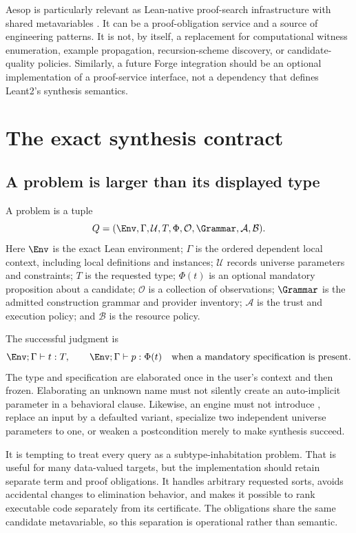 Aesop is particularly relevant as Lean-native proof-search infrastructure with shared metavariables \cite{aesop}. It can be a proof-obligation service and a source of engineering patterns. It is not, by itself, a replacement for computational witness enumeration, example propagation, recursion-scheme discovery, or candidate-quality policies. Similarly, a future Forge integration should be an optional implementation of a proof-service interface, not a dependency that defines Leant2's synthesis semantics.

\section{The exact synthesis contract}
\label{sec:contract}

\subsection{A problem is larger than its displayed type}

\begin{definition}
A problem is a tuple
\[
 Q=(\Env,\Gamma,\mathcal U,T,\Phi,\mathcal O,\Grammar,\mathcal A,\mathcal B).
\]
Here $\Env$ is the exact Lean environment; $\Gamma$ is the ordered dependent local context, including local definitions and instances; $\mathcal U$ records universe parameters and constraints; $T$ is the requested type; $\Phi(t)$ is an optional mandatory proposition about a candidate; $\mathcal O$ is a collection of observations; $\Grammar$ is the admitted construction grammar and provider inventory; $\mathcal A$ is the trust and execution policy; and $\mathcal B$ is the resource policy.
\end{definition}

The successful judgment is
\[
 \Env;\Gamma\vdash t:T,
 \qquad
 \Env;\Gamma\vdash p:\Phi(t)
 \quad\text{when a mandatory specification is present.}
\]
The type and specification are elaborated once in the user's context and then frozen. Elaborating an unknown name must not silently create an auto-implicit parameter in a behavioral clause. Likewise, an engine must not introduce , replace an input by a defaulted variant, specialize two independent universe parameters to one, or weaken a postcondition merely to make synthesis succeed.

It is tempting to treat every query as a subtype-inhabitation problem. That is useful for many data-valued targets, but the implementation should retain separate term and proof obligations. It handles arbitrary requested sorts, avoids accidental changes to elimination behavior, and makes it possible to rank executable code separately from its certificate. The obligations share the same candidate metavariable, so this separation is operational rather than semantic.

